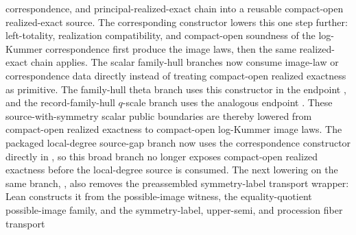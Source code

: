 \documentclass[11pt]{article}
\theoremstyle{plain}
\theoremstyle{definition}
\theoremstyle{remark}
\begin{document}
correspondence, and principal-realized-exact chain into a reusable compact-open
realized-exact source.  The corresponding constructor
\texttt{}
lowers this one step further: left-totality, realization compatibility, and
compact-open soundness of the log-Kummer correspondence first produce the image
laws, then the same realized-exact chain applies.  The scalar family-hull
branches now consume image-law or correspondence data directly instead of
treating compact-open realized exactness as primitive.  The family-hull theta
branch uses this constructor in the endpoint
\texttt{},
and the record-family-hull \(q\)-scale branch uses the analogous endpoint
\texttt{}.
These source-with-symmetry scalar public boundaries are thereby lowered from
compact-open realized exactness to compact-open log-Kummer image laws.  The
packaged local-degree source-gap branch now uses the correspondence constructor
directly in
\texttt{},
so this broad branch no longer exposes compact-open realized exactness before
the local-degree source is consumed.  The next lowering on the same branch,
\texttt{},
also removes the preassembled symmetry-label transport wrapper: Lean constructs
it from the possible-image witness, the equality-quotient possible-image
family, and the symmetry-label, upper-semi, and procession fiber transport
\end{document}
